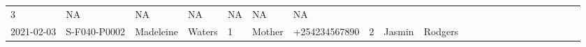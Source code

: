 \documentclass[
]{article}
\begin{document}
\begin{longtable}[]{@{}llllllllllllllllllllll@{}}
\begin{minipage}[t]{0.02\columnwidth}
3\strut
\end{minipage} & \begin{minipage}[t]{0.01\columnwidth}\raggedright
NA\strut
\end{minipage} & \begin{minipage}[t]{0.02\columnwidth}\raggedright
NA\strut
\end{minipage} & \begin{minipage}[t]{0.03\columnwidth}\raggedright
NA\strut
\end{minipage} & \begin{minipage}[t]{0.02\columnwidth}\raggedright
NA\strut
\end{minipage} & \begin{minipage}[t]{0.02\columnwidth}\raggedright
NA\strut
\end{minipage} & \begin{minipage}[t]{0.03\columnwidth}\raggedright
NA\strut
\end{minipage}\tabularnewline
\begin{minipage}[t]{0.02\columnwidth}\raggedright
2021-02-03\strut
\end{minipage} & \begin{minipage}[t]{0.02\columnwidth}\raggedright
S-F040-P0002\strut
\end{minipage} & \begin{minipage}[t]{0.02\columnwidth}\raggedright
Madeleine\strut
\end{minipage} & \begin{minipage}[t]{0.02\columnwidth}\raggedright
Waters\strut
\end{minipage} & \begin{minipage}[t]{0.01\columnwidth}\raggedright
1\strut
\end{minipage} & \begin{minipage}[t]{0.07\columnwidth}\raggedright
Mother\strut
\end{minipage} & \begin{minipage}[t]{0.03\columnwidth}\raggedright
+254234567890\strut
\end{minipage} & \begin{minipage}[t]{0.02\columnwidth}\raggedright
2\strut
\end{minipage} & \begin{minipage}[t]{0.02\columnwidth}\raggedright
Jasmin\strut
\end{minipage} & \begin{minipage}[t]{0.02\columnwidth}\raggedright
Rodgers\strut
\end{minipage} & \begin{minipage}[t]{0.01\columnwidth}\raggedright

\end{minipage}
\end{longtable}
\end{document}
